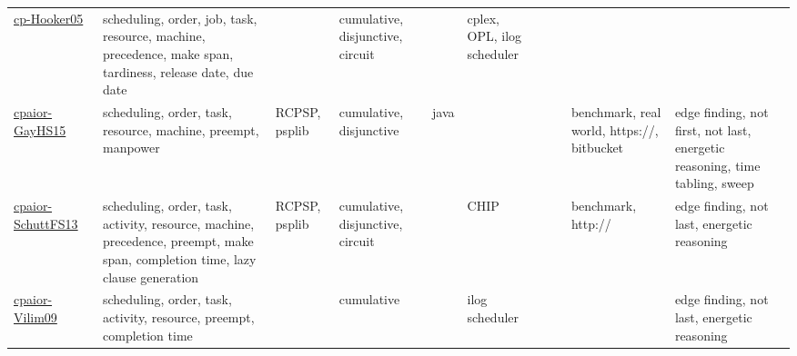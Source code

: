{\begin{longtable}{p{3cm}p{4cm}p{2cm}p{2cm}p{2cm}p{2cm}p{2cm}p{2cm}p{2cm}p{2cm}}
\href{papers/cp-Hooker05.pdf}{cp-Hooker05}~\cite{cp-Hooker05} & scheduling, order, job, task, resource, machine, precedence, make span, tardiness, release date, due date &  & cumulative, disjunctive, circuit &  & cplex, OPL, ilog scheduler &  &  &  & \\
\href{papers/cpaior-GayHS15.pdf}{cpaior-GayHS15}~\cite{cpaior-GayHS15} & scheduling, order, task, resource, machine, preempt, manpower & RCPSP, psplib & cumulative, disjunctive & java  &  &  &  & benchmark, real world, https://, bitbucket & edge finding, not first, not last, energetic reasoning, time tabling, sweep\\
\href{papers/cpaior-SchuttFS13.pdf}{cpaior-SchuttFS13}~\cite{cpaior-SchuttFS13} & scheduling, order, task, activity, resource, machine, precedence, preempt, make span, completion time, lazy clause generation & RCPSP, psplib & cumulative, disjunctive, circuit &  & CHIP &  &  & benchmark, http:// & edge finding, not last, energetic reasoning\\
\href{papers/cpaior-Vilim09.pdf}{cpaior-Vilim09}~\cite{cpaior-Vilim09} & scheduling, order, task, activity, resource, preempt, completion time &  & cumulative &  & ilog scheduler &  &  &  & edge finding, not last, energetic reasoning\\
\end{longtable}
}

